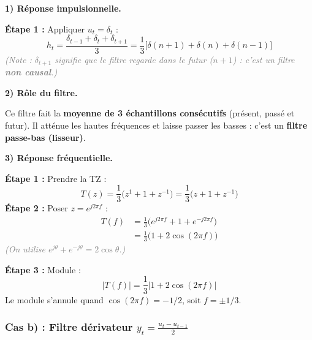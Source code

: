 \documentclass[12pt,a4paper]{article}
\newcommand{\step}[1]{\textcolor{coursbleu}{\textbf{Étape #1 :}}}
\newcommand{\explication}[1]{\textit{\textcolor{gray}{(#1)}}}
\newcommand{\encadre}[1]{\boxed{#1}}
\begin{document}
\begin{tcolorbox}[corrbox, title=Correction -- Cas a : Moyenneur]
\textbf{1) Réponse impulsionnelle.}

\step{1} Appliquer $u_t = \delta_t$ :
\[
  h_t = \frac{\delta_{t-1}+\delta_t+\delta_{t+1}}{3}
      = \frac{1}{3}\bigl[\delta(n+1) + \delta(n) + \delta(n-1)\bigr]
\]
\explication{Note : $\delta_{t+1}$ signifie que le filtre regarde \textit{dans le futur} ($n+1$) :
c'est un filtre \textbf{non causal}.}

\medskip
\textbf{2) Rôle du filtre.}

Ce filtre fait la \textbf{moyenne de 3 échantillons consécutifs} (présent, passé et futur).
Il atténue les hautes fréquences et laisse passer les basses : c'est un \textbf{filtre passe-bas (lisseur)}.

\medskip
\textbf{3) Réponse fréquentielle.}

\step{1} Prendre la TZ :
\[
  T(z) = \frac{1}{3}\bigl(z^{1} + 1 + z^{-1}\bigr)
       = \frac{1}{3}\bigl(z + 1 + z^{-1}\bigr)
\]
\step{2} Poser $z = e^{j2\pi f}$ :
\begin{align*}
  T(f) &= \frac{1}{3}\bigl(e^{j2\pi f} + 1 + e^{-j2\pi f}\bigr) \\
       &= \frac{1}{3}\bigl(1 + 2\cos(2\pi f)\bigr)
\end{align*}
\explication{On utilise $e^{j\theta} + e^{-j\theta} = 2\cos\theta$.}

\step{3} Module :
\[
  \encadre{|T(f)| = \frac{1}{3}\left|1 + 2\cos(2\pi f)\right|}
\]
Le module s'annule quand $\cos(2\pi f) = -1/2$, soit $f = \pm 1/3$.
\end{tcolorbox}

\subsubsection*{Cas b) : Filtre dérivateur $y_t = \frac{u_t - u_{t-1}}{2}$}
\end{document}
